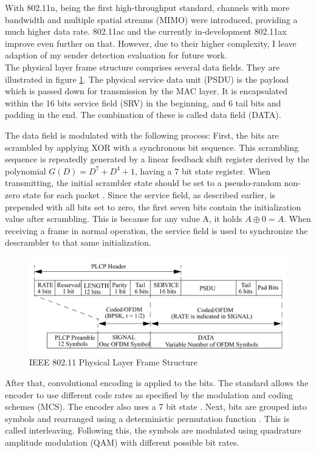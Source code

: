 With 802.11n, being the first high-throughput standard, channels with more bandwidth and multiple spatial streams (MIMO) were introduced, providing a much higher data rate. 802.11ac and the currently in-development 802.11ax improve even further on that. However, due to their higher complexity, I leave adaption of my sender detection evaluation for future work.\\

The physical layer frame structure comprises several data fields. They are illustrated in figure \ref{fig:phy-format}. The physical service data unit (PSDU) is the payload which is passed down for transmission by the MAC layer. It is encapsulated within the 16 bits service field (SRV) in the beginning, and 6 tail bits and padding in the end. The combination of these is called data field (DATA).

The data field is modulated with the following process: First, the bits are scrambled by applying XOR with a synchronous bit sequence. This scrambling sequence is repeatedly generated by a linear feedback shift register derived by the polynomial $G(D)=D^7+D^4+1$, having a 7 bit state register. When transmitting, the initial scrambler state should be set to a pseudo-random non-zero state for each packet \cite{ieee2012}. Since the service field, as described earlier, is prepended with all bits set to zero, the first seven bits contain the initialization value after scrambling. This is because for any value A, it holds $A \oplus 0 = A$. When receiving a frame in normal operation, the service field is used to synchronize the descrambler to that same initialization.

\begin{figure}[H]
	\centering
	\includegraphics[width=\textwidth]{gfx/images/phy-format}
	\caption[IEEE 802.11 Physical Layer Frame Structure]{IEEE 802.11 Physical Layer Frame Structure \cite{ieee2012}}
	\label{fig:phy-format}
\end{figure}

After that, convolutional encoding is applied to the bits. The standard allows the encoder to use different code rates as specified by the modulation and coding schemes (MCS). The encoder also uses a 7 bit state \cite{park2009}. Next, bits are grouped into symbols and rearranged using a deterministic permutation function \cite{perahia2013}. This is called interleaving. Following this, the symbols are modulated using quadrature amplitude modulation (QAM)	with different possible bit rates.\\

